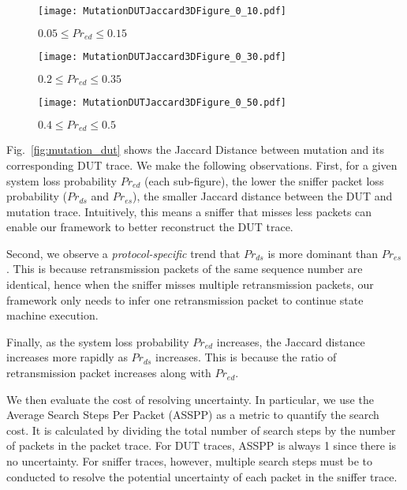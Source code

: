 \begin{figure*}[t!]
  \centering
  \begin{subfigure}{0.33\textwidth}
    \centering
    \texttt{[image: MutationDUTJaccard3DFigure\_0\_10.pdf]}
    \caption{$0.05 \le Pr_{ed} \le 0.15$}
  \end{subfigure}\hspace*{0.01\textwidth}
  \begin{subfigure}{0.33\textwidth}
    \centering
    \texttt{[image: MutationDUTJaccard3DFigure\_0\_30.pdf]}
    \caption{$0.2 \le Pr_{ed} \le 0.35$}
  \end{subfigure}\hspace*{0.01\textwidth}
  \begin{subfigure}{0.33\textwidth}
    \centering
    \texttt{[image: MutationDUTJaccard3DFigure\_0\_50.pdf]}
    \caption{$0.4 \le Pr_{ed} \le 0.5$}
  \end{subfigure}\hspace*{0.01\textwidth}
  \caption{\textbf{Jaccard Distance Between Mutation and DUT Traces.} For each
  data point, the mean of the 5 runs is used.}
  \label{fig:mutation_dut}
\end{figure*}


Fig.~\ref{fig:mutation_dut} shows the Jaccard Distance between mutation and its
corresponding DUT trace. We make the following observations. First, for a given
system loss probability $Pr_{ed}$ (each sub-figure), the lower the sniffer
packet loss probability ($Pr_{ds}$ and $Pr_{es}$), the smaller Jaccard distance
between the DUT and mutation trace. Intuitively, this means a sniffer that
misses less packets can enable our framework to better reconstruct the DUT
trace.

Second, we observe a \textit{protocol-specific} trend that $Pr_{ds}$ is more
dominant than $Pr_{es}$.  This is because retransmission packets of the same
sequence number are identical, hence when the sniffer misses multiple
retransmission packets, our framework only needs to infer one retransmission
packet to continue state machine execution.

Finally, as the system loss probability $Pr_{ed}$ increases, the Jaccard
distance increases more rapidly as $Pr_{ds}$ increases.  This is because the
ratio of retransmission packet increases along with $Pr_{ed}$.


We then evaluate the cost of resolving uncertainty. In particular, we use
the Average Search Steps Per Packet (ASSPP) as a metric to quantify the search
cost.  It is calculated by dividing the total number of search steps by the
number of packets in the packet trace. For DUT traces, ASSPP is always 1 since
there is no uncertainty. For sniffer traces, however, multiple search steps must
be to conducted to resolve the potential uncertainty of each packet in the
sniffer trace.

